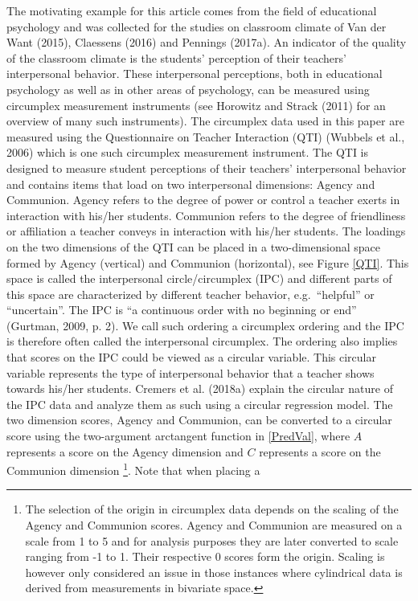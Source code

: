 \documentclass[man]{apa6}
\let\rmarkdownfootnote\footnote%
\def\footnote{\protect\rmarkdownfootnote}
\DeclareRobustCommand{\VANDER}[3]{#2}
\begin{document}
The motivating example for this article comes from the field of educational
psychology and was collected for the studies on classroom climate of
\VANDER{Want}{Van der}{van der} Want (2015), Claessens (2016) and Pennings (2017a). An
indicator of the quality of the classroom climate is the students' perception of
their teachers' interpersonal behavior. These interpersonal perceptions, both in
educational psychology as well as in other areas of psychology, can be measured
using circumplex measurement instruments (see Horowitz and Strack (2011) for an
overview of many such instruments).\newline
\indent The circumplex data used in this paper are measured using the
Questionnaire on Teacher Interaction (QTI) (Wubbels et al., 2006) which is
one such circumplex measurement instrument. The QTI is designed to measure
student perceptions of their teachers' interpersonal behavior and contains items
that load on two interpersonal dimensions: Agency and Communion. Agency refers
to the degree of power or control a teacher exerts in interaction with his/her
students. Communion refers to the degree of friendliness or affiliation a
teacher conveys in interaction with his/her students. The loadings on the two
dimensions of the QTI can be placed in a two-dimensional space formed by Agency
(vertical) and Communion (horizontal), see Figure \ref{QTI}. This space is
called the interpersonal circle/circumplex (IPC) and different parts of this
space are characterized by different teacher behavior, e.g.~\enquote{helpful} or
\enquote{uncertain}. The IPC is ``a continuous order with no beginning or end''
(Gurtman, 2009, p. 2). We call such ordering a circumplex ordering and
the IPC is therefore often called the interpersonal circumplex. The ordering
also implies that scores on the IPC could be viewed as a circular variable. This
circular variable represents the type of interpersonal behavior that a teacher
shows towards his/her students.\newline
\indent Cremers et al. (2018a) explain the circular nature of the IPC data and
analyze them as such using a circular regression model. The two dimension
scores, Agency and Communion, can be converted to a circular score using the
two-argument arctangent function in \eqref{PredVal}, where \(A\) represents a score on the Agency dimension and
\(C\) represents a score on the Communion dimension \footnote{The selection of
the origin in circumplex data depends on the scaling of the Agency and Communion
scores. Agency and Communion are measured on a scale from 1 to 5 and for
analysis purposes they are later converted to scale ranging from -1 to 1.  Their
respective 0 scores form the origin. Scaling is however only considered an issue
in those instances where cylindrical data is derived from measurements in
bivariate space.}. Note that when placing a
\end{document}
